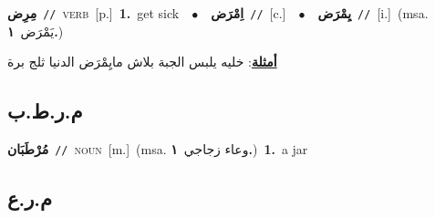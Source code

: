 \documentclass[10pt,a4paper,twoside]{article} %
\begin{document}
\begin{multicols}{2}
{\setlength\topsep{0pt}\textbf{\foreignlanguage{arabic}{مِرِض}}\ {\color{gray}\texttt{//}\color{black}}\ \textsc{verb}\ [p.]\ \textbf{1.}~get sick\ \ $\bullet$\ \ \setlength\topsep{0pt}\textbf{\foreignlanguage{arabic}{اِمْرَض}}\ {\color{gray}\texttt{//}\color{black}}\ [c.]\ \ $\bullet$\ \ \setlength\topsep{0pt}\textbf{\foreignlanguage{arabic}{يِمْرَض}}\ {\color{gray}\texttt{//}\color{black}}\ [i.]\ \color{gray}(msa. \foreignlanguage{arabic}{يَمْرَض}~\foreignlanguage{arabic}{\textbf{١.}})\color{black}\  \begin{flushright}\color{gray}\foreignlanguage{arabic}{\textbf{\underline{\foreignlanguage{arabic}{أمثلة}}}: خليه يلبس الجبة بلاش مايِمْرَض الدنيا ثلج برة}\end{flushright}\color{black}} \vspace{2mm}

\vspace{-3mm}
\subsection*{\color{blue}\foreignlanguage{arabic}{م.ر.ط.ب}\color{blue}{ (ntws)}} 

{\setlength\topsep{0pt}\textbf{\foreignlanguage{arabic}{مُرْطَبَان}}\ {\color{gray}\texttt{//}\color{black}}\ \textsc{noun}\ [m.]\ \color{gray}(msa. \foreignlanguage{arabic}{وعاء زجاجي}~\foreignlanguage{arabic}{\textbf{١.}})\color{black}\ \textbf{1.}~a jar\ } \vspace{2mm}

\vspace{-3mm}
\subsection*{\color{blue}\foreignlanguage{arabic}{م.ر.ع}\color{blue}{}} 


\end{multicols}
\end{document}
